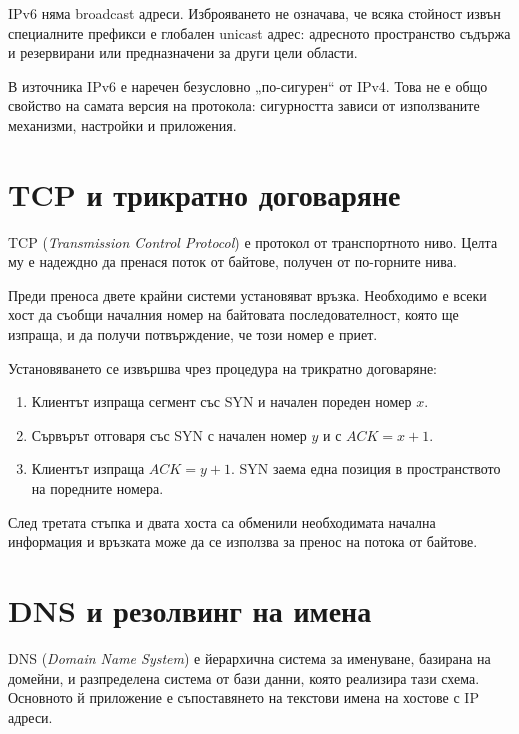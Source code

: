 IPv6 няма broadcast адреси. Изброяването не означава, че всяка стойност извън специалните префикси е глобален unicast адрес: адресното пространство съдържа и резервирани или предназначени за други цели области.

\begin{supp}
В източника IPv6 е наречен безусловно „по-сигурен“ от IPv4. Това не е общо свойство на самата версия на протокола: сигурността зависи от използваните механизми, настройки и приложения.
\end{supp}

\section{TCP и трикратно договаряне}\label{s:13.6}

\begin{defn}[TCP]
TCP (\emph{Transmission Control Protocol}) е протокол от транспортното ниво. Целта му е надеждно да пренася поток от байтове, получен от по-горните нива.
\end{defn}

Преди преноса двете крайни системи установяват връзка. Необходимо е всеки хост да съобщи началния номер на байтовата последователност, която ще изпраща, и да получи потвърждение, че този номер е приет.

Установяването се извършва чрез процедура на трикратно договаряне:

\begin{enumerate}
    \item Клиентът изпраща сегмент със SYN и начален пореден номер $x$.
    \item Сървърът отговаря със SYN с начален номер $y$ и с $ACK=x+1$.
    \item Клиентът изпраща $ACK=y+1$. SYN заема една позиция в пространството на поредните номера.
\end{enumerate}

След третата стъпка и двата хоста са обменили необходимата начална информация и връзката може да се използва за пренос на потока от байтове.

\section{DNS и резолвинг на имена}\label{s:13.7}

\begin{defn}[DNS]
DNS (\emph{Domain Name System}) е йерархична система за именуване, базирана на домейни, и разпределена система от бази данни, която реализира тази схема. Основното й приложение е съпоставянето на текстови имена на хостове с IP адреси.
\end{defn}

